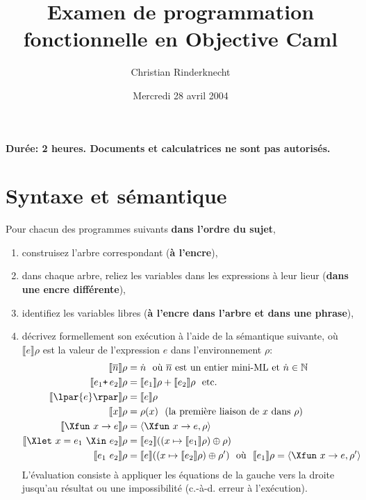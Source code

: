 \documentclass[11pt, a4paper]{article}
\title{Examen de programmation fonctionnelle en Objective Caml}
\author{Christian Rinderknecht}
\date{Mercredi 28 avril 2004}
\newcommand{\evalf}[2]{\llbracket{#1}\rrbracket{#2}}
\begin{document}
\maketitle

\centerline{\textbf{Durée: 2 heures. Documents et calculatrices ne sont
pas autorisés.}}


\section{Syntaxe et sémantique}

\noindent Pour chacun des programmes suivants \textbf{dans l'ordre du sujet},

\begin{enumerate}

  \item construisez l'arbre correspondant (\textbf{à l'encre}),

  \item dans chaque arbre, reliez les variables dans les expressions à
  leur lieur (\textbf{dans une encre différente}),

  \item identifiez les variables libres (\textbf{à l'encre dans
  l'arbre et dans une phrase}),

  \item décrivez formellement son exécution à l'aide de la sémantique
  suivante, où $\evalf{e}{\rho}$ est la valeur de l'expression $e$
  dans l'environnement $\rho$:
\begin{align*}
\evalf{\overline{n}}{\rho} &= \dot{n} \ \ \textnormal{où $\overline{n}$
  est un entier mini-ML et $\dot{n} \in \mathbb{N}$}\\
\evalf{e_1 \texttt{+} \, e_2}{\rho} &= \evalf{e_1}{\rho} +
\evalf{e_2}{\rho} \ \ \textnormal{etc.}\\
\evalf{\lpar{e}\rpar}{\rho} &= \evalf{e}{\rho}\\
\evalf{x}{\rho} &= \rho(x) \ \ \textnormal{(la première liaison de $x$ dans $\rho$)}\\
\evalf{\Xfun \,\, x \rightarrow e}{\rho} &= \langle\Xfun \,\, x
\rightarrow e, \rho\rangle\\
\evalf{\Xlet \,\, x = e_1 \,\, \Xin \,\, e_2}{\rho} &= \evalf{e_2}{((x
  \mapsto \evalf{e_1}{\rho}) \oplus \rho)}\\
\evalf{e_1 \,\, e_2}{\rho} &= \evalf{e}{((x \mapsto \evalf{e_2}{\rho})
  \oplus \rho')} \ \ \textnormal{où} \ \ \evalf{e_1}{\rho} = \langle\Xfun \,\, x
\rightarrow e,\rho'\rangle
\end{align*}
  L'évaluation consiste à appliquer les équations de la gauche vers la
  droite jusqu'au résultat ou une impossibilité (c.-à-d. erreur à
  l'exécution).

\end{enumerate}
\end{document}
